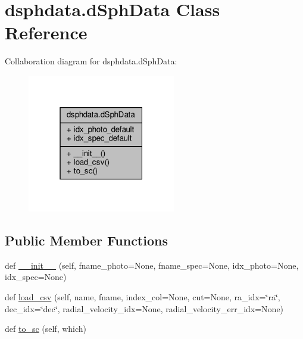 \hypertarget{classdsphdata_1_1dSphData}{}\section{dsphdata.\+d\+Sph\+Data Class Reference}
\label{classdsphdata_1_1dSphData}


Collaboration diagram for dsphdata.\+d\+Sph\+Data\+:\nopagebreak
\begin{figure}[H]
\begin{center}
\leavevmode
\includegraphics[width=183pt]{da/d49/classdsphdata_1_1dSphData__coll__graph}
\end{center}
\end{figure}
\subsection*{Public Member Functions}
\begin{DoxyCompactItemize}
\item 
def \hyperlink{classdsphdata_1_1dSphData_afcd54ca5255be74de80578f5962daba8}{\+\_\+\+\_\+init\+\_\+\+\_\+} (self, fname\+\_\+photo=None, fname\+\_\+spec=None, idx\+\_\+photo=None, idx\+\_\+spec=None)
\item 
def \hyperlink{classdsphdata_1_1dSphData_a582365655d5493e34b14c2697e79c4fe}{load\+\_\+csv} (self, name, fname, index\+\_\+col=None, cut=None, ra\+\_\+idx=\char`\"{}ra\char`\"{}, dec\+\_\+idx=\char`\"{}dec\char`\"{}, radial\+\_\+velocity\+\_\+idx=None, radial\+\_\+velocity\+\_\+err\+\_\+idx=None)
\item 
def \hyperlink{classdsphdata_1_1dSphData_a5384bafd3c725eb6c324664c7b47eae1}{to\+\_\+sc} (self, which)
\end{DoxyCompactItemize}
